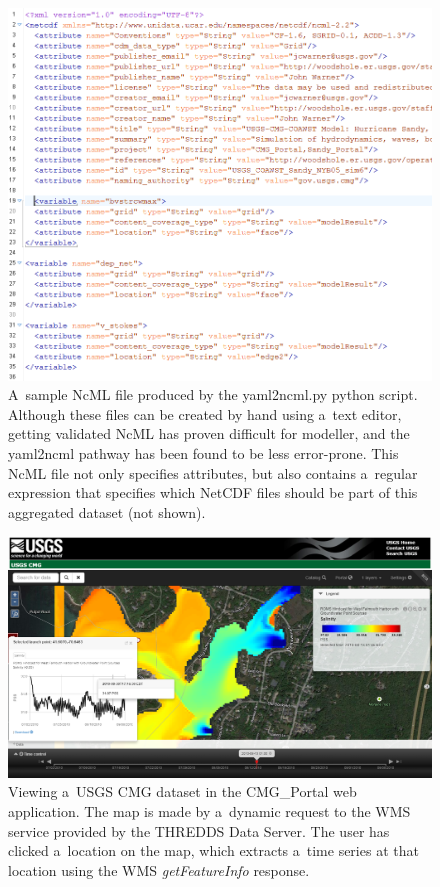 \documentclass[osd, online, hvmath]{copernicus}
\begin{document}
\begin{figure}
\includegraphics[width=130mm]{os-2015-64-discussions-f08.png}
\caption{A~sample NcML file produced by the yaml2ncml.py python
  script.  Although these files can be created by hand using a~text
  editor, getting validated NcML has proven difficult for modeller,
  and the yaml2ncml pathway has been found to be less
  error-prone. This NcML file not only specifies attributes, but also
  contains a~regular expression that specifies which NetCDF files
  should be part of this aggregated dataset (not shown).}
\label{osd-2015-0064-f08.pdf}
\end{figure}

\begin{figure}
\includegraphics[width=145mm]{os-2015-64-discussions-f09.png}
\caption{Viewing a~USGS CMG dataset in the CMG\_Portal web
  application. The map is made by a~dynamic request to the WMS service
  provided by the THREDDS Data Server. The user has clicked a~location
  on the map, which extracts a~time series at that location using the
  WMS \textit{getFeatureInfo} response. }
\label{osd-2015-0064-f09.pdf}
\end{figure}
\end{document}
